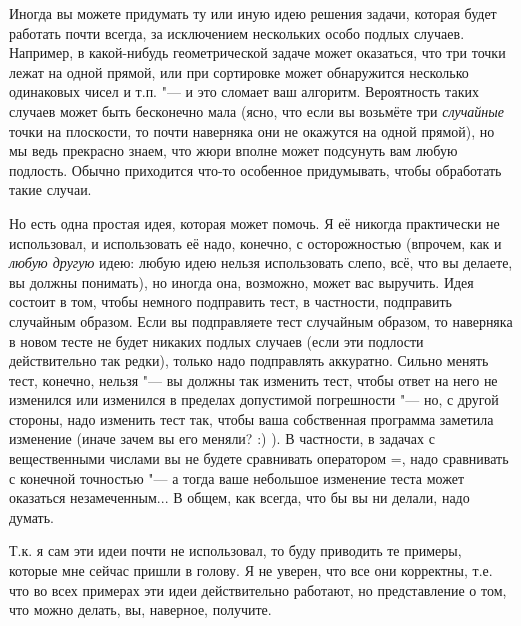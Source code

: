 Иногда вы можете придумать ту или иную идею решения задачи, которая 
будет работать почти всегда, за исключением нескольких особо подлых случаев. Например, в 
какой-нибудь геометрической задаче может оказаться, что три точки лежат на одной прямой, или при 
сортировке может обнаружится несколько одинаковых чисел и т.п. "--- и это сломает ваш алгоритм. Вероятность таких 
случаев может быть бесконечно мала (ясно, что если вы возьмёте три \textit{случайные} точки на 
плоскости, то почти наверняка они не окажутся на одной прямой), но мы ведь прекрасно знаем, что 
жюри вполне может подсунуть вам любую подлость. Обычно приходится что-то особенное придумывать, 
чтобы обработать такие случаи.

Но есть одна простая идея, которая может помочь. Я её никогда практически не использовал, и использовать её 
надо, конечно, с осторожностью (впрочем, как и \textit{любую другую} идею: любую идею нельзя 
использовать слепо, всё, что вы делаете, вы должны понимать), но иногда она, возможно, может вас 
выручить. Идея состоит в том, чтобы немного подправить тест, в частности, подправить случайным 
образом. Если вы подправляете тест случайным образом, то наверняка в новом тесте не будет никаких 
подлых случаев (если эти подлости действительно так редки), только надо подправлять аккуратно. 
Сильно менять тест, конечно, нельзя "--- вы должны так изменить тест, чтобы ответ на него не 
изменился или изменился в пределах допустимой погрешности "--- но, с другой стороны, надо изменить 
тест так, чтобы ваша собственная программа заметила изменение (иначе зачем вы его меняли? :) ). В 
частности, в задачах с вещественными числами вы не будете сравнивать оператором =, надо сравнивать 
с конечной точностью "--- а тогда ваше небольшое изменение теста может оказаться незамеченным... В 
общем, как всегда, что бы вы ни делали, надо думать.

Т.к. я сам эти идеи почти не использовал, то буду приводить те примеры, которые мне сейчас пришли в 
голову. Я не уверен, что все они корректны, т.е. что во всех примерах эти идеи действительно 
работают, но представление о том, что можно делать, вы, наверное, получите.

